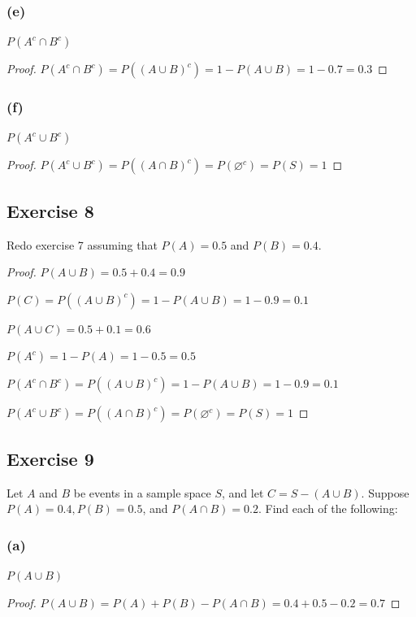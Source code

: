\documentclass[14pt]{extarticle}
\newcommand{\es}{\varnothing}
\begin{document}
\subsubsection{(e)}
\(P(A^c \cap B^c)\)
\begin{proof}
     \(P(A^c \cap B^c) = P((A \cup B)^c) = 1 - P(A \cup B) = 1 - 0.7 = 0.3\)
\end{proof}

\subsubsection{(f)}
\(P(A^c \cup B^c)\)
\begin{proof}
     \(P(A^c \cup B^c) = P((A \cap B)^c) = P(\es^c) = P(S) = 1\)
\end{proof}

\subsection{Exercise 8}
Redo exercise 7 assuming that \(P(A) = 0.5\) and \(P(B) = 0.4\).

\begin{proof}
     \(P(A \cup B) = 0.5 + 0.4 = 0.9\)

     \(P(C) = P((A \cup B)^c) = 1 - P(A \cup B) = 1 - 0.9 = 0.1\)

     \(P(A \cup C) = 0.5 + 0.1 = 0.6\)

     \(P(A^c) = 1 - P(A) = 1 - 0.5 = 0.5\)

     \(P(A^c \cap B^c) = P((A \cup B)^c) = 1 - P(A \cup B) = 1 - 0.9 = 0.1\)

     \(P(A^c \cup B^c) = P((A \cap B)^c) = P(\es^c) = P(S) = 1\)
\end{proof}

\subsection{Exercise 9}
Let \(A\) and \(B\) be events in a sample space \(S\), and let \(C = S - (A \cup B)\). Suppose \(P(A) = 0.4, P(B) = 0.5\),
and \(P(A \cap B) = 0.2\). Find each of the following:

\subsubsection{(a)}
\(P(A \cup B)\)
\begin{proof}
     \(P(A \cup B) = P(A) + P(B) - P(A \cap B) = 0.4 + 0.5 - 0.2 = 0.7\)
\end{proof}
\end{document}
